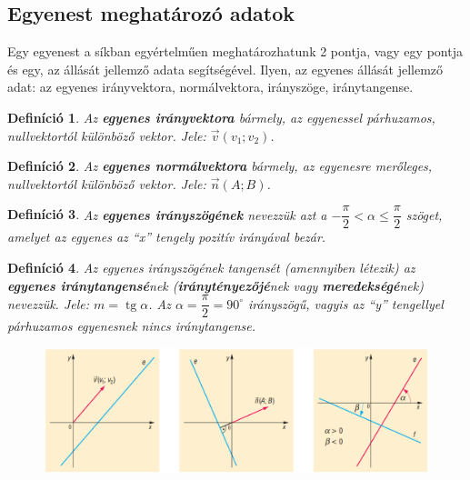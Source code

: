 \documentclass[12pt,a4paper]{article}
\newtheorem{definition}{Definíció} [section]
\DeclareMathOperator{\tg}{tg}
\begin{document}
\subsection{Egyenest meghatározó adatok}
Egy egyenest a síkban egyértelműen meghatározhatunk 2 pontja, vagy egy pontja és egy, az állását jellemző adata segítségével. Ilyen, az egyenes állását jellemző adat: az egyenes irányvektora, normálvektora, irányszöge, iránytangense.

\begin{definition}
Az \textbf{egyenes irányvektora} bármely, az egyenessel párhuzamos, nullvektortól különböző vektor. Jele: $\vec{v}(v_1;v_2)$.
\end{definition}

\begin{definition}
Az \textbf{egyenes normálvektora} bármely, az egyenesre merőleges, nullvektortól különböző vektor. Jele: $\vec{n}(A;B)$.
\end{definition}

\begin{definition}
Az \textbf{egyenes irányszögének} nevezzük azt a $-\dfrac{\pi}{2}<\alpha \leq \dfrac{\pi}{2}$ szöget, amelyet az egyenes az ``x'' tengely pozitív irányával bezár.
\end{definition}

\begin{definition}
Az egyenes irányszögének tangensét (amennyiben létezik) az \textbf{egyenes iránytangensé}nek (\textbf{iránytényezőjé}nek vagy \textbf{meredekségé}nek) nevezzük. Jele: $m=\tg \alpha$. Az $\alpha=\dfrac{\pi}{2}=90^\circ$ irányszögű, vagyis az ``y'' tengellyel párhuzamos egyenesnek nincs iránytangense.
\begin{figure}[h!]
\centering
\includegraphics[scale=0.35]{geometry/iranytangens}
\end{figure}
\end{definition}
\end{document}
